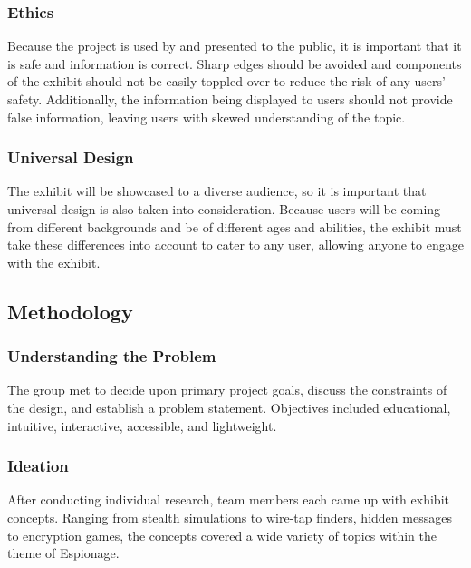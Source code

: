 \documentclass[conference]{IEEEtran}
\begin{document}
\subsubsection{Ethics}

\par Because the project is used by and presented to the public, it is important that it is safe and information is correct.  Sharp edges should be avoided and components of the exhibit should not be easily toppled over to reduce the risk of any users’ safety.  Additionally, the information being displayed to users should not provide false information, leaving users with skewed understanding of the topic.

\subsubsection{Universal Design}

\par The exhibit will be showcased to a diverse audience, so it is important that universal design is also taken into consideration.  Because users will be coming from different backgrounds and be of different ages and abilities, the exhibit must take these differences into account to cater to any user, allowing anyone to engage with the exhibit.

\subsection{Methodology}

\subsubsection{Understanding the Problem}

\par The group met to decide upon primary project goals, discuss the constraints of the design, and establish a problem statement.  Objectives included educational, intuitive, interactive, accessible, and lightweight.

\subsubsection{Ideation}

\par After conducting individual research, team members each came up with exhibit concepts.  Ranging from stealth simulations to wire-tap finders, hidden messages to encryption games, the concepts covered a wide variety of topics within the theme of Espionage. 
\end{document}
